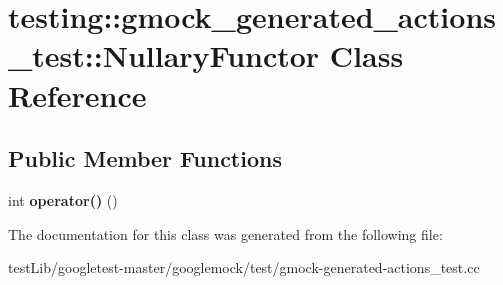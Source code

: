\hypertarget{classtesting_1_1gmock__generated__actions__test_1_1NullaryFunctor}{}\section{testing\+:\+:gmock\+\_\+generated\+\_\+actions\+\_\+test\+:\+:Nullary\+Functor Class Reference}
\label{classtesting_1_1gmock__generated__actions__test_1_1NullaryFunctor}
\subsection*{Public Member Functions}
\begin{DoxyCompactItemize}
\item 
\mbox{\label{classtesting_1_1gmock__generated__actions__test_1_1NullaryFunctor_afcf5ace9bbb5a2a91482688bdc20fa07}} 
int {\bfseries operator()} ()
\end{DoxyCompactItemize}


The documentation for this class was generated from the following file\+:\begin{DoxyCompactItemize}
\item 
test\+Lib/googletest-\/master/googlemock/test/gmock-\/generated-\/actions\+\_\+test.\+cc\end{DoxyCompactItemize}
